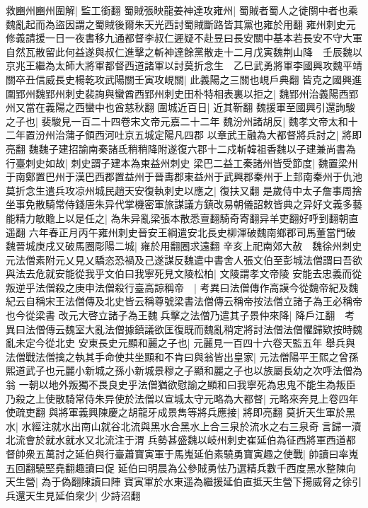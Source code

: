 救豳州豳州圍解|{
	監工銜翻}
蜀賊張映龍姜神達攻雍州|{
	蜀賊者蜀人之徙關中者也乘魏亂起而為盜因謂之蜀賊後爾朱天光西討蜀賊斷路皆其黨也雍於用翻}
雍州刺史元修義請援一日一夜書移九通都督李叔仁遲疑不赴昱曰長安關中基本若長安不守大軍自然瓦散留此何益遂與叔仁進擊之斬神達餘黨散走十二月戊寅魏荆山降　壬辰魏以京兆王繼為太師大將軍都督西道諸軍以討莫折念生　乙巳武勇將軍李國興攻魏平靖關卒丑信威長史楊乾攻武陽關壬寅攻峴關|{
	此義陽之三關也峴戶典翻}
皆克之國興進圍郢州魏郢州刺史裴詢與蠻酋西郢州刺史田朴特相表裏以拒之|{
	魏郢州治義陽西郢州又當在義陽之西蠻中也酋慈秋翻}
圍城近百日|{
	近其靳翻}
魏援軍至國興引還詢駿之子也|{
	裴駿見一百二十四卷宋文帝元嘉二十二年}
魏汾州諸胡反|{
	魏孝文帝太和十二年置汾州治蒲子領西河吐京五城定陽凡四郡}
以章武王融為大都督將兵討之|{
	將即亮翻}
魏魏子建招諭南秦諸氐稍稍降附遂復六郡十二戍斬韓祖香魏以子建兼尚書為行臺刺史如故|{
	刺史謂子建本為東益州刺史}
梁巴二益工秦諸州皆受節度|{
	魏置梁州于南鄭置巴州于漢巴西郡置益州于晉夀郡東益州于武興郡秦州于上邽南秦州于仇池}
莫折念生遣兵攻凉州城民趙天安復執刺史以應之|{
	復扶又翻}
是歲侍中太子詹事周捨坐事免散騎常侍錢唐朱异代掌機密軍旅謀議方鎮改易朝儀詔敕皆典之异好文義多藝能精力敏贍上以是任之|{
	為朱异亂梁張本散悉亶翻騎奇寄翻异羊吏翻好呼到翻朝直遥翻}
六年春正月丙午雍州刺史晉安王綱遣安北長史柳渾破魏南鄉郡司馬董當門破魏晉城庚戌又破馬圈彫陽二城|{
	雍於用翻圈求遠翻}
辛亥上祀南郊大赦　魏徐州刺史元法僧素附元乂見乂驕恣恐禍及己遂謀反魏遣中書舍人張文伯至彭城法僧謂曰吾欲與法去危就安能從我乎文伯曰我寧死見文陵松柏|{
	文陵謂孝文帝陵}
安能去忠義而從叛逆乎法僧殺之庚申法僧殺行臺高諒稱帝　|{
	考異曰法僧傳作高謨今從魏帝紀及魏紀云自稱宋王法僧傳及北史皆云稱尊號梁書法僧傳云稱帝按法僧立諸子為王必稱帝也今從梁書}
改元大啓立諸子為王魏兵擊之法僧乃遣其子景仲來降|{
	降戶江翻　考異曰法僧傳云魏室大亂法僧據鎮議欲匡復既而魏亂稍定將討法僧法僧懼歸欵按時魏亂未定今從北史}
安東長史元顯和麗之子也|{
	元麗見一百四十六卷天監五年}
舉兵與法僧戰法僧擒之執其手命使共坐顯和不肯曰與翁皆出皇家|{
	元法僧陽平王熙之曾孫熙道武子也元麗小新城之孫小新城景穆之子顯和麗之子也以族屬長幼之次呼法僧為翁}
一朝以地外叛獨不畏良史乎法僧猶欲慰諭之顯和曰我寧死為忠鬼不能生為叛臣乃殺之上使散騎常侍朱异使於法僧以宣城太守元略為大都督|{
	元略來奔見上卷四年使疏吏翻}
與將軍義興陳慶之胡龍牙成景雋等將兵應接|{
	將即亮翻}
莫折天生軍於黑水|{
	水經注就水出南山就谷北流與黑水合黑水上合三泉於流水之右三泉奇言歸一瀆北流會於就水就水又北流注于渭}
兵勢甚盛魏以岐州刺史崔延伯為征西將軍西道都督帥衆五萬討之延伯與行臺蕭寶寅軍于馬嵬延伯素驍勇寶寅趣之使戰|{
	帥讀曰率嵬五回翻驍堅堯翻趣讀曰促}
延伯曰明晨為公參賊勇怯乃選精兵數千西度黑水整陳向天生營|{
	為于偽翻陳讀曰陣}
寶寅軍於水東遥為繼援延伯直抵天生營下揚威脅之徐引兵還天生見延伯衆少|{
	少詩沼翻}

